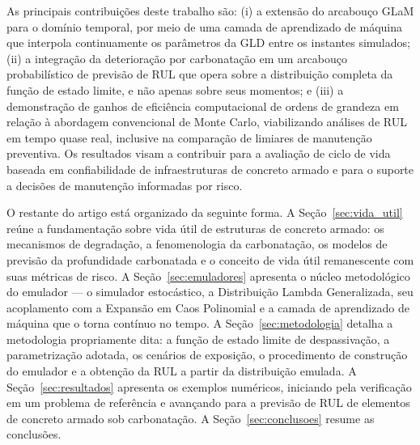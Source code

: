 As principais contribuições deste trabalho são: (i) a extensão do arcabouço GLaM para o domínio temporal, por meio de uma camada de aprendizado de máquina que interpola continuamente os parâmetros da GLD entre os instantes simulados; (ii) a integração da deterioração por carbonatação em um arcabouço probabilístico de previsão de RUL que opera sobre a distribuição completa da função de estado limite, e não apenas sobre seus momentos; e (iii) a demonstração de ganhos de eficiência computacional de ordens de grandeza em relação à abordagem convencional de Monte Carlo, viabilizando análises de RUL em tempo quase real, inclusive na comparação de limiares de manutenção preventiva. Os resultados visam a contribuir para a avaliação de ciclo de vida baseada em confiabilidade de infraestruturas de concreto armado e para o suporte a decisões de manutenção informadas por risco.

O restante do artigo está organizado da seguinte forma. A Seção~\ref{sec:vida_util} reúne a fundamentação sobre vida útil de estruturas de concreto armado: os mecanismos de degradação, a fenomenologia da carbonatação, os modelos de previsão da profundidade carbonatada e o conceito de vida útil remanescente com suas métricas de risco. A Seção~\ref{sec:emuladores} apresenta o núcleo metodológico do emulador --- o simulador estocástico, a Distribuição Lambda Generalizada, seu acoplamento com a Expansão em Caos Polinomial e a camada de aprendizado de máquina que o torna contínuo no tempo. A Seção~\ref{sec:metodologia} detalha a metodologia propriamente dita: a função de estado limite de despassivação, a parametrização adotada, os cenários de exposição, o procedimento de construção do emulador e a obtenção da RUL a partir da distribuição emulada. A Seção~\ref{sec:resultados} apresenta os exemplos numéricos, iniciando pela verificação em um problema de referência e avançando para a previsão de RUL de elementos de concreto armado sob carbonatação. A Seção~\ref{sec:conclusoes} resume as conclusões.
